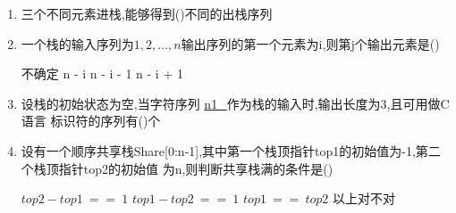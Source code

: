 \documentclass[12pt, a4paper, oneside, UTF8]{ctexbook}
\begin{document}
\begin{enumerate}
    \item 三个不同元素进栈,能够得到()不同的出栈序列 
    
    \item 一个栈的输入序列为$1,2,\ldots,n$输出序列的第一个元素为i,则第j个输出元素是() 
    \begin{choices}
        \task 不确定
        \task n - i 
        \task n - i - 1
        \task n - i + 1
    \end{choices}


    \item 设栈的初始状态为空,当字符序列 \underline{n1\_}作为栈的输入时,输出长度为3,且可用做C语言
    标识符的序列有()个
    \begin{choices}
    \end{choices}
    \item 设有一个顺序共享栈Share[0:n-1],其中第一个栈顶指针top1的初始值为-1,第二个栈顶指针top2的初始值
    为n,则判断共享栈满的条件是() 
    \begin{choices}[2]
        \task $top2-top1\ ==\ 1$
        \task $top1-top2\ ==\ 1$ 
        \task $top1\ ==\ top2$ 
        \task 以上对不对
    \end{choices}


\end{enumerate}
\end{document}
